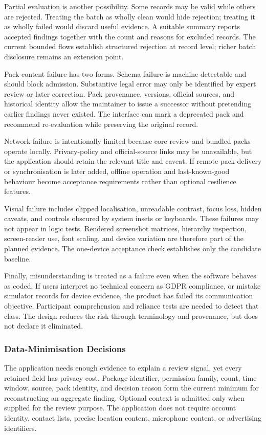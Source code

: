 Partial evaluation is another possibility. Some records may be valid while others are rejected. Treating the batch as wholly clean would hide rejection; treating it as wholly failed would discard useful evidence. A suitable summary reports accepted findings together with the count and reasons for excluded records. The current bounded flows establish structured rejection at record level; richer batch disclosure remains an extension point.

Pack-content failure has two forms. Schema failure is machine detectable and should block admission. Substantive legal error may only be identified by expert review or later correction. Pack provenance, versions, official sources, and historical identity allow the maintainer to issue a successor without pretending earlier findings never existed. The interface can mark a deprecated pack and recommend re-evaluation while preserving the original record.

Network failure is intentionally limited because core review and bundled packs operate locally. Privacy-policy and official-source links may be unavailable, but the application should retain the relevant title and caveat. If remote pack delivery or synchronisation is later added, offline operation and last-known-good behaviour become acceptance requirements rather than optional resilience features.

Visual failure includes clipped localisation, unreadable contrast, focus loss, hidden caveats, and controls obscured by system insets or keyboards. These failures may not appear in logic tests. Rendered screenshot matrices, hierarchy inspection, screen-reader use, font scaling, and device variation are therefore part of the planned evidence. The one-device acceptance check establishes only the candidate baseline.

Finally, misunderstanding is treated as a failure even when the software behaves as coded. If users interpret no technical concern as GDPR compliance, or mistake simulator records for device evidence, the product has failed its communication objective. Participant comprehension and reliance tests are needed to detect that class. The design reduces the risk through terminology and provenance, but does not declare it eliminated.

\subsubsection{Data-Minimisation Decisions}

The application needs enough evidence to explain a review signal, yet every retained field has privacy cost. Package identifier, permission family, count, time window, source, pack identity, and decision reason form the current minimum for reconstructing an aggregate finding. Optional context is admitted only when supplied for the review purpose. The application does not require account identity, contact lists, precise location content, microphone content, or advertising identifiers.

